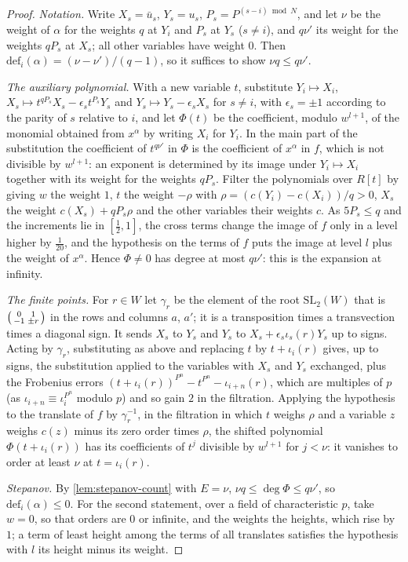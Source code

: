 \begin{proof}
\emph{Notation.} Write $X_s=\bar u_s$, $Y_s=u_s$, $P_s=P^{(s-i)\bmod N}$, and let $\nu$ be the weight of $\alpha$ for the weights $q$ at $Y_i$ and $P_s$ at $Y_s$ ($s\ne i$), and $q\nu'$ its weight for the weights $qP_s$ at $X_s$; all other variables have weight $0$. Then $\mathrm{def}_i(\alpha)=(\nu-\nu')/(q-1)$, so it suffices to show $\nu q\le q\nu'$.

\emph{The auxiliary polynomial.} With a new variable $t$, substitute $Y_i\mapsto X_i$, $X_s\mapsto t^{qP_s}X_s-\epsilon_st^{P_s}Y_s$ and $Y_s\mapsto Y_s-\epsilon_sX_s$ for $s\ne i$, with $\epsilon_s=\pm1$ according to the parity of $s$ relative to $i$, and let $\Phi(t)$ be the coefficient, modulo $w^{l+1}$, of the monomial obtained from $x^\alpha$ by writing $X_i$ for $Y_i$. In the main part of the substitution the coefficient of
$t^{q\nu'}$ in $\Phi$ is the coefficient of $x^\alpha$ in $f$, which is not divisible by $w^{l+1}$: an exponent is determined by its image under $Y_i\mapsto X_i$ together with its weight for the weights $qP_s$. Filter the polynomials over $R[t]$ by giving $w$ the weight $1$, $t$ the weight $-\rho$ with $\rho=(c(Y_i)-c(X_i))/q>0$, $X_s$ the weight $c(X_s)+qP_s\rho$ and the other variables their weights $c$. As
$5P_s\le q$ and the increments lie in $[\frac12,1]$, the cross terms change the image of $f$ only in a level higher by $\frac1{20}$, and the hypothesis on the terms of $f$ puts the image at level $l$ plus the weight of $x^\alpha$. Hence $\Phi\ne0$ has degree at most $q\nu'$: this is the expansion at infinity.

\emph{The finite points.} For $r\in W$ let $\gamma_r$ be the element of the root $\mathrm{SL}_2(W)$ that is $\begin{psmallmatrix}0&1\\-1&\pm r\end{psmallmatrix}$ in the rows and columns $a$, $a'$; it is a transposition times a transvection times a diagonal sign. It sends $X_s$ to $Y_s$ and $Y_s$ to $X_s+\epsilon_s\iota_s(r)Y_s$ up to signs. Acting by $\gamma_r$, substituting as above and replacing $t$ by $t+\iota_i(r)$
gives, up to signs, the substitution applied to the variables with $X_s$ and $Y_s$ exchanged, plus the Frobenius errors $(t+\iota_i(r))^{P^n}-t^{P^n}-\iota_{i+n}(r)$, which are multiples of $p$ (as $\iota_{i+n}\equiv\iota_i^{P^n}$ modulo $p$) and so gain $2$ in the filtration. Applying the hypothesis to the translate of $f$ by $\gamma_r^{-1}$, in the filtration in which $t$ weighs $\rho$ and a variable $z$ weighs
$c(z)$ minus its zero order times $\rho$, the shifted polynomial $\Phi(t+\iota_i(r))$ has its coefficients of $t^j$ divisible by $w^{l+1}$ for $j<\nu$: it vanishes to order at least $\nu$ at $t=\iota_i(r)$.

\emph{Stepanov.} By \cref{lem:stepanov-count} with $E=\nu$, $\nu q\le\deg\Phi\le q\nu'$, so $\mathrm{def}_i(\alpha)\le0$. For the second statement, over a field of characteristic $p$, take $w=0$, so that orders are $0$ or infinite, and the weights the heights, which rise by $1$; a term of least height among the terms of all translates satisfies the hypothesis with $l$ its height minus its weight.
\end{proof}

